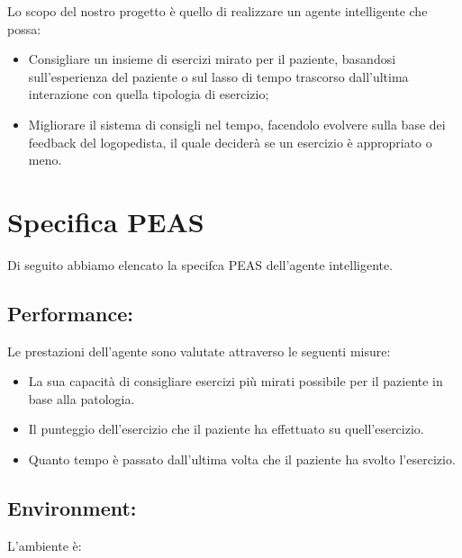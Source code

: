 \documentclass{article}
\begin{document}
    Lo scopo del nostro progetto è quello di realizzare un agente intelligente che possa:

    \begin{itemize}
        \item Consigliare un insieme di esercizi mirato per il paziente, basandosi sull'esperienza del paziente o sul lasso di tempo trascorso dall'ultima interazione con quella tipologia di esercizio;
        \item Migliorare il sistema di consigli nel tempo, facendolo evolvere sulla base dei feedback del logopedista, il quale deciderà se un esercizio è appropriato o meno.
    \end{itemize}


    \pagebreak

    \section{Specifica PEAS}

    Di seguito abbiamo elencato la specifca PEAS dell'agente intelligente.

    \subsection{Performance:}

    Le prestazioni dell’agente sono valutate attraverso le seguenti misure:

    \begin{itemize}
        \item La sua capacità di consigliare esercizi più mirati possibile per il paziente in base alla patologia.
        \item Il punteggio dell'esercizio che il paziente ha effettuato su quell'esercizio.
        \item Quanto tempo è passato dall'ultima volta che il paziente ha svolto l'esercizio.
    \end{itemize}

    \subsection{Environment:}

    L’ambiente è:
\end{document}

